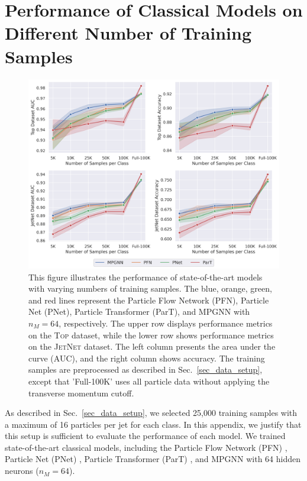 \documentclass[reprint,amsmath,amssymb,prd,nofootinbib]{revtex4-2}
\newcommand{\Top}{\textsc{Top}\xspace}
\newcommand{\JetNet}{\textsc{JetNet}\xspace}
\begin{document}
\section{Performance of Classical Models on Different Number of Training Samples} \label{app_num_data}

\begin{figure}[htbp]
    \centering
    \includegraphics[width=\textwidth]{fig_app_num_train.png}
    \caption{This figure illustrates the performance of state-of-the-art models with varying numbers of training samples. The blue, orange, green, and red lines represent the Particle Flow Network (PFN), Particle Net (PNet), Particle Transformer (ParT), and MPGNN with $n_M=64$, respectively. The upper row displays performance metrics on the \Top dataset, while the lower row shows performance metrics on the \JetNet dataset. The left column presents the area under the curve (AUC), and the right column shows accuracy. The training samples are preprocessed as described in Sec.~\ref{sec_data_setup}, except that 'Full-100K' uses all particle data without applying the transverse momentum cutoff.}
    \label{fig:app_num_train}
\end{figure}

As described in Sec.~\ref{sec_data_setup}, we selected 25,000 training samples with a maximum of 16 particles per jet for each class. In this appendix, we justify that this setup is sufficient to evaluate the performance of each model. We trained state-of-the-art classical models, including the Particle Flow Network (PFN) \cite{pfn}, Particle Net (PNet) \cite{ptcnet}, Particle Transformer (ParT) \cite{part}, and MPGNN with 64 hidden neurons ($n_M=64$).
\end{document}
